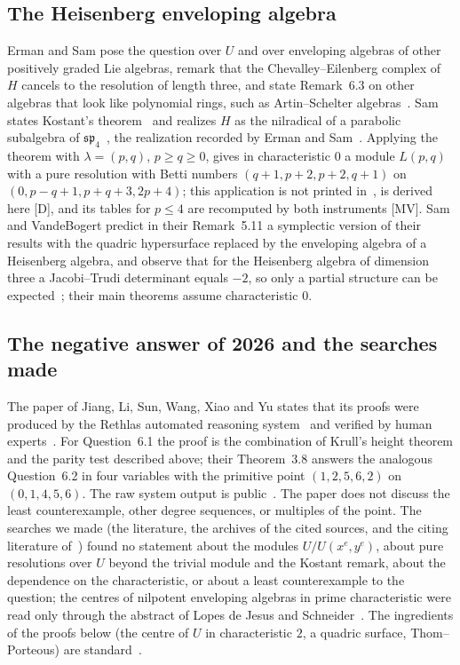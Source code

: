 \documentclass[11pt]{article}
\theoremstyle{definition}
\theoremstyle{remark}
\begin{document}
\subsection{The Heisenberg enveloping algebra}

Erman and Sam pose the question over $U$ and over enveloping algebras of other positively graded Lie algebras, remark that the Chevalley--Eilenberg complex of $H$ cancels to the resolution of length three, and state Remark~6.3 on other algebras that look like polynomial rings, such as Artin--Schelter algebras~\cite[Section~6]{ES16}. Sam states Kostant's theorem~\cite[Theorem~2.1]{Sam15} and realizes $H$ as the nilradical of a parabolic subalgebra of $\mathfrak{sp}_4$~\cite[Section~2.2]{Sam15}, the realization recorded by Erman and Sam~\cite[Section~6]{ES16}. Applying the theorem with $\lambda=(p,q)$, $p\ge q\ge0$, gives in characteristic $0$ a module $L(p,q)$ with a pure resolution with Betti numbers $(q+1,p+2,p+2,q+1)$ on $(0,p-q+1,p+q+3,2p+4)$; this application is not printed in~\cite{ES16,Sam15}, is derived here [D], and its tables for $p\le4$ are recomputed by both instruments [MV]. Sam and VandeBogert predict in their Remark~5.11 a symplectic version of their results with the quadric hypersurface replaced by the enveloping algebra of a Heisenberg algebra, and observe that for the Heisenberg algebra of dimension three a Jacobi--Trudi determinant equals $-2$, so only a partial structure can be expected~\cite{SVB}; their main theorems assume characteristic $0$.

\subsection{The negative answer of 2026 and the searches made}

The paper of Jiang, Li, Sun, Wang, Xiao and Yu states that its proofs were produced by the Rethlas automated reasoning system~\cite{Ju26} and verified by human experts~\cite{JLSWXY}. For Question~6.1 the proof is the combination of Krull's height theorem and the parity test described above; their Theorem~3.8 answers the analogous Question~6.2 in four variables with the primitive point $(1,2,5,6,2)$ on $(0,1,4,5,6)$. The raw system output is public~\cite{RethlasRes}. The paper does not discuss the least counterexample, other degree sequences, or multiples of the point. The searches we made (the literature, the archives of the cited sources, and the citing literature of~\cite{JLSWXY}) found no statement about the modules $U/U(x^e,y^e)$, about pure resolutions over $U$ beyond the trivial module and the Kostant remark, about the dependence on the characteristic, or about a least counterexample to the question; the centres of nilpotent enveloping algebras in prime characteristic were read only through the abstract of Lopes de Jesus and Schneider~\cite{LdJS}. The ingredients of the proofs below (the centre of $U$ in characteristic $2$, a quadric surface, Thom--Porteous) are standard~\cite{Fulton}.
\end{document}
